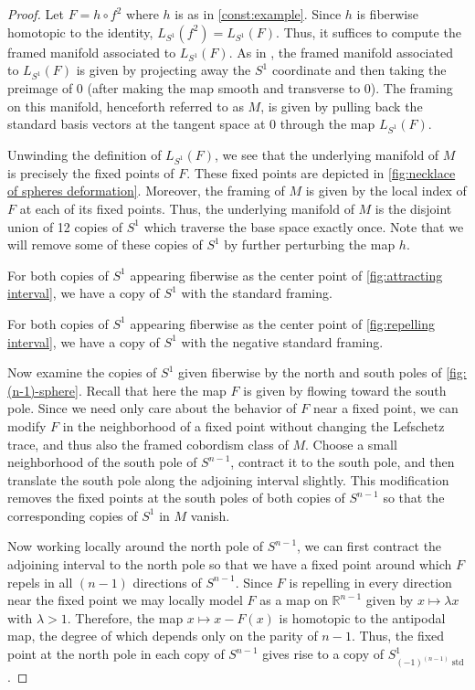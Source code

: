 \documentclass[11pt]{amsart}
\newcommand{\R}{\mathbb R}
\DeclareMathOperator{\std}{std}
\theoremstyle{plain}   %
\theoremstyle{definition}
\theoremstyle{remark}
\numberwithin{equation}{section}
\begin{document}
\begin{proof}
Let $F = h\circ f^2$ where $h$ is as in \cref{const:example}. Since $h$ is fiberwise homotopic to the identity, $L_{S^1}(f^2) = L_{S^1}(F)$. Thus, it suffices to compute the framed manifold associated to $L_{S^1}(F)$. As in \cite[Proposition 3.40]{williams_framed_PT}, the framed manifold associated to $L_{S^1}(F)$ is given by projecting away the $S^1$ coordinate and then taking the preimage of 0 (after making the map smooth and transverse to 0). The framing on this manifold, henceforth referred to as $M$, is given by pulling back the standard basis vectors at the tangent space at 0 through the map $L_{S^1}(F)$. 

Unwinding the definition of $L_{S^1}(F)$, we see that the underlying manifold of $M$ is precisely the fixed points of $F$. These fixed points are depicted in \cref{fig:necklace of spheres deformation}. Moreover, the framing of $M$ is given by the local index of $F$ at each of its fixed points. Thus, the underlying manifold of $M$ is the disjoint union of 12 copies of $S^1$ which traverse the base space exactly once. Note that we will remove some of these copies of $S^1$ by further perturbing the map $h$.

For both copies of $S^1$ appearing fiberwise as the center point of \cref{fig:attracting interval}, we have a copy of $S^1$ with the standard framing.

For both copies of $S^1$ appearing fiberwise as the center point of \cref{fig:repelling interval}, we have a copy of $S^1$ with the negative standard framing.

Now examine the copies of $S^1$ given fiberwise by the north and south poles of \cref{fig:(n-1)-sphere}. Recall that here the map $F$ is given by flowing toward the south pole. Since we need only care about the behavior of $F$ near a fixed point, we can modify $F$ in the neighborhood of a fixed point without changing the Lefschetz trace, and thus also the framed cobordism class of $M$. Choose a small neighborhood of the south pole of $S^{n-1}$, contract it to the south pole, and then translate the south pole along the adjoining interval slightly. This modification removes the fixed points at the south poles of both copies of $S^{n-1}$ so that the corresponding copies of $S^1$ in $M$ vanish.  

Now working locally around the north pole of $S^{n-1}$, we can first contract the adjoining interval to the north pole so that we have a fixed point around which $F$ repels in all $(n-1)$ directions of $S^{n-1}$. Since $F$ is repelling in every direction near the fixed point we may locally model $F$ as a map on $\R^{n-1}$ given by $x\mapsto \lambda x$ with $\lambda>1$. Therefore, the map $x\mapsto x-F(x)$ is homotopic to the antipodal map, the degree of which depends only on the parity of $n-1$. Thus, the fixed point at the north pole in each copy of $S^{n-1}$ gives rise to a copy of $S^1_{(-1)^{(n-1)}\std}$.


\end{proof}
\end{document}
